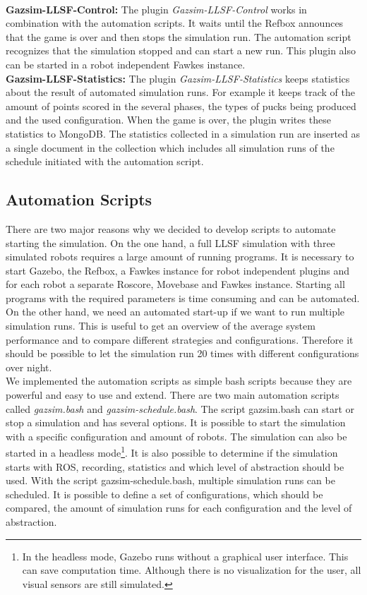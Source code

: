 \\
\textbf{Gazsim-LLSF-Control:}
The plugin \textit{Gazsim-LLSF-Control} works in combination with the automation scripts. It waits until the Refbox announces that the game is over and then stops the simulation run. The automation script recognizes that the simulation stopped and can start a new run. This plugin also can be started in a robot independent Fawkes instance.
\\
\textbf{Gazsim-LLSF-Statistics:}
The plugin \textit{Gazsim-LLSF-Statistics} keeps statistics about the result of automated simulation runs. For example it keeps track of the amount of points scored in the several phases, the types of pucks being produced and the used configuration. When the game is over, the plugin writes these statistics to MongoDB. The statistics collected in a simulation run are inserted as a single document in the collection which includes all simulation runs of the schedule initiated with the automation script.



\subsection{Automation Scripts}
There are two major reasons why we decided to develop scripts to automate starting the simulation. On the one hand, a full LLSF simulation with three simulated robots requires a large amount of running programs. It is necessary to start Gazebo, the Refbox, a Fawkes instance for robot independent plugins and for each robot a separate Roscore, Movebase and Fawkes instance. Starting all programs with the required parameters is time consuming and can be automated. On the other hand, we need an automated start-up if we want to run multiple simulation runs. This is useful to get an overview of the average system performance and to compare different strategies and configurations. Therefore it should be possible to let the simulation run 20 times with different configurations over night.\\
We implemented the automation scripts as simple bash scripts because they are powerful and easy to use and extend. There are two main automation scripts called \textit{gazsim.bash} and \textit{gazsim-schedule.bash}. The script gazsim.bash can start or stop a simulation and has several options. It is possible to start the simulation with a specific configuration and amount of robots. The simulation can also be started in a headless mode\footnote{In the headless mode, Gazebo runs without a graphical user interface. This can save computation time. Although there is no visualization for the user, all visual sensors are still simulated.}. It is also possible to determine if the simulation starts with ROS, recording, statistics and which level of abstraction should be used. With the script gazsim-schedule.bash, multiple simulation runs can be scheduled. It is possible to define a set of configurations, which should be compared, the amount of simulation runs for each configuration and the level of abstraction.

